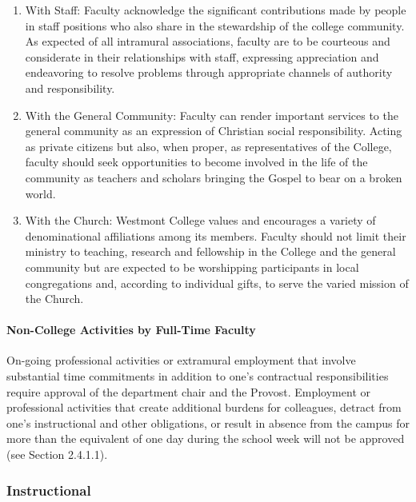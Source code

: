 \documentclass[letterpaper, 11pt]{article}
\begin{document}
\begin{enumerate}[label=\alph*)]
					\item{With Staff:  Faculty acknowledge the significant contributions made by people in staff positions who also share in the stewardship of the college community.  As expected of all intramural associations, faculty are to be courteous and considerate in their relationships with staff, expressing appreciation and endeavoring to resolve problems through appropriate channels of authority and responsibility.}
					\item{With the General Community:  Faculty can render important services to the general community as an expression of Christian social responsibility.  Acting as private citizens but also, when proper, as representatives of the College, faculty should seek opportunities to become involved in the life of the community as teachers and scholars bringing the Gospel to bear on a broken world.}
					\item{With the Church:  Westmont College values and encourages a variety of denominational affiliations among its members.  Faculty should not limit their ministry to teaching, research and fellowship in the College and the general community but are expected to be worshipping participants in local congregations and, according to individual gifts, to serve the varied mission of the Church.}
				\end{enumerate}
			\paragraph{Non-College Activities by Full-Time Faculty}
				On-going professional activities or extramural employment that involve substantial time commitments in addition to one's contractual responsibilities require approval of the department chair and the Provost.  Employment or professional activities that create additional burdens for colleagues, detract from one's instructional and other obligations, or result in absence from the campus for more than the equivalent of one day during the school week will not be approved (see Section 2.4.1.1).
		\subsubsection{Instructional}
\end{document}
